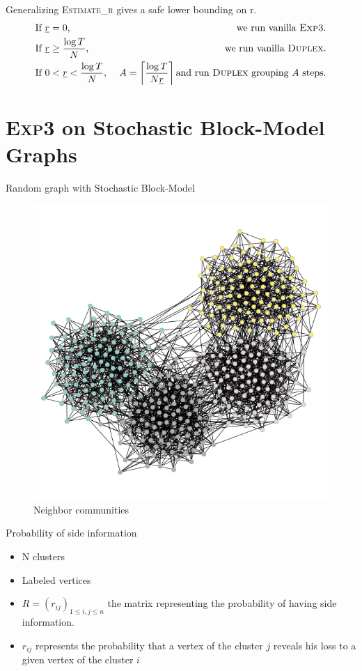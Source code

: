 \documentclass[11pt]{beamer}
\begin{document}
\begin{frame}{Generalizing}
\textsc{Estimate\_r} gives a safe lower bounding on r.
\begin{align*}
&\text{If }\underline{r}=0,\ & \text{ we run vanilla } \textsc{Exp3}.\\
&\text{If } \underline{r} \geq \frac{\log T}{N},\  & \text{ we run vanilla }\textsc{Duplex}.\\
&\text{If } 0 < \underline{r} < \frac{\log T}{N},\ & A =\left\lceil \frac{\log T}{N \underline{r}} \right\rceil \text{and run } \textsc{Duplex} \text{ grouping } A \text{ steps}.  
\end{align*}
\end{frame}

\section{\textsc{Exp3} on Stochastic Block-Model Graphs}
\begin{frame}{Random graph with Stochastic Block-Model}
\begin{figure}[ht]
	\centering
	\includegraphics[width=.5\textwidth]{blockmodel_unsuccess}
	\caption{Neighbor communities}
\end{figure}
\end{frame}

\begin{frame}{Probability of side information}
\begin{itemize}
\item N clusters
\item Labeled vertices
\item $R=(r_{ij})_{1 \leq i,j \leq n} $ the matrix representing the probability of having side information.
\item $r_{ij}$ represents the probability that a vertex of the cluster $j$ reveals his loss to a given vertex of the cluster $i$
\end{itemize}

\end{frame}
\end{document}

